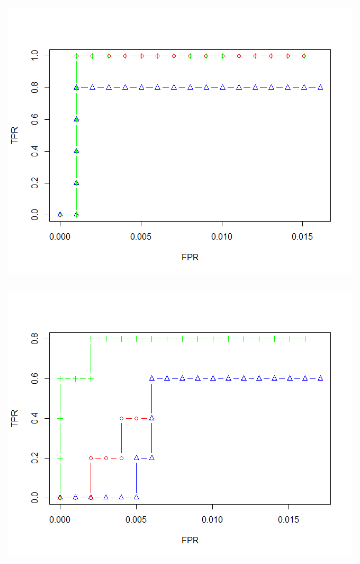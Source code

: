 \documentclass[11pt]{report}\usepackage[utf8]{inputenc}
\begin{document}
\begin{figure}[h]
\begin{subfigure}[b]{0.3\textwidth}
        \includegraphics[width=\textwidth]{../plots/100sample06}
        \caption{}
    \end{subfigure}
    \begin{subfigure}[b]{0.3\textwidth}
        \includegraphics[width=\textwidth]{../plots/100sample03}
        \caption{}
    \end{subfigure}
    \begin{subfigure}[b]{0.3\textwidth}

\end{subfigure}
\end{figure}
\end{document}
